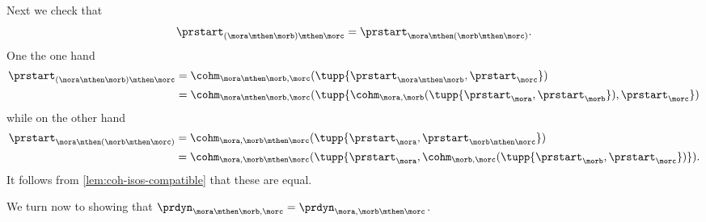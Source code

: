 Next we check that 
\begin{equation}
\prstart_{(\mora \mthen \morb)\mthen \morc}  =\prstart_{\mora \mthen (\morb \mthen \morc)}.
\end{equation}
One the one hand
\begin{align*}
\prstart_{(\mora \mthen \morb)\mthen \morc} &= \cohm_{\mora \mthen \morb, \morc}( \tupp{\prstart_{\mora \mthen \morb}, \prstart_{\morc}}) \\
& = \cohm_{\mora \mthen \morb, \morc}( \tupp{ \cohm_{\mora, \morb}( \tupp{\prstart_{\mora}, \prstart_{\morb}}), \prstart_{\morc}})
\end{align*}
while on the other hand 
\begin{align*}
\prstart_{\mora \mthen (\morb \mthen \morc)} &= \cohm_{\mora,\morb \mthen \morc}( \tupp{\prstart_{\mora}, \prstart_{\morb \mthen \morc}}) \\
& = \cohm_{\mora,\morb \mthen \morc}( \tupp{\prstart_{\mora}, \cohm_{\morb, \morc}( \tupp{\prstart_{\morb}, \prstart_{\morc}})}).
\end{align*}
It follows from \cref{lem:coh-isos-compatible} that these are equal.


We turn now to showing that $\prdyn_{\mora \mthen \morb, \morc} = \prdyn_{\mora, \morb \mthen \morc}$.

